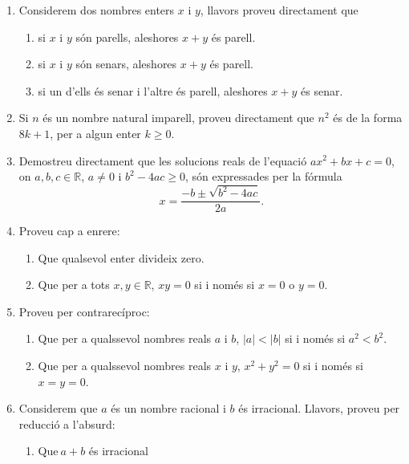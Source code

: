 \begin{enumerate}
\item Considerem dos nombres enters $x$ i $y$, llavors proveu directament que

\begin{enumerate}
\item si $x$ i $y$ són parells, aleshores $x+y$ és parell.

\item si $x$ i $y$ són senars, aleshores $x+y$ és parell.

\item si un d'ells és senar i l'altre és parell, aleshores $x+y$
és senar.
\end{enumerate}

\item Si $n$ és un nombre natural imparell, proveu directament que $n^{2}
$ és de la forma $8k+1$, per a algun enter $k\geq0$.

\item Demostreu directament que les solucions reals de l'equació $ax^{2}+bx+c=0
$, on $a,b,c\in\mathbb{R}$, $a\neq0$ i $b^{2}-4ac\geq0$, són expressades per la
fórmula
\[
x=\frac{-b\pm\sqrt{b^{2}-4ac}}{2a}.
\]


\item Proveu cap a enrere:

\begin{enumerate}
\item Que qualsevol enter divideix zero.

\item Que per a tots $x,y\in\mathbb{R}$, $xy=0$ si i només si $x=0$ o
$y=0$.
\end{enumerate}

\item Proveu per contrarecíproc:

\begin{enumerate}
\item Que per a qualssevol nombres reals $a$ i $b$, $\left\vert a\right\vert
<\left\vert b\right\vert $ si i només si $a^{2}<b^{2}$.

\item Que per a qualssevol nombres reals $x$ i $y$, $x^{2}+y^{2}=0$ si i
només si $x=y=0$.
\end{enumerate}

\item Considerem que $a$ és un nombre racional i $b$ és irracional.
Llavors, proveu per reducció a l'absurd:

\begin{enumerate}
\item Que$~a+b$ és irracional


\end{enumerate}
\end{enumerate}
